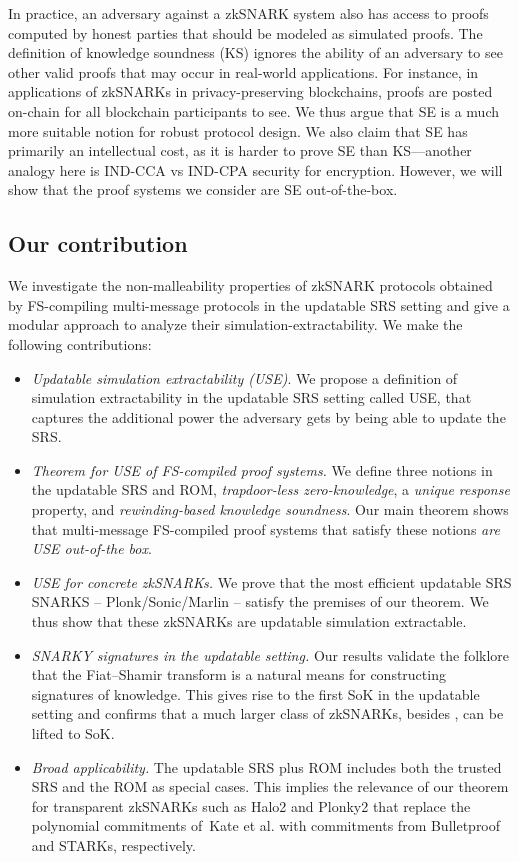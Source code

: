 \documentclass[11pt]{llncs}
\begin{document}
In practice, an adversary against a zkSNARK system also has access to proofs
computed by honest parties that should be modeled as simulated proofs. The
definition of knowledge soundness (KS) ignores the ability of an adversary to
see other valid proofs that may occur in real-world applications. For instance,
in applications of zkSNARKs in privacy-preserving blockchains, proofs are
posted on-chain for all blockchain participants to see. We thus argue that SE
is a much more suitable notion for robust protocol design. We also claim that
SE has primarily an intellectual cost, as it is harder to prove SE than
KS---another analogy here is IND-CCA vs IND-CPA security for encryption.
However, we will show that the proof systems we consider are SE out-of-the-box.

\subsection{Our contribution}
We investigate the non-malleability properties of zkSNARK protocols obtained by FS-compiling multi-message protocols in the updatable SRS setting and give a modular approach to analyze their simulation-extractability. We make the following contributions:
\begin{itemize}
\item 
\emph{Updatable simulation extractability (USE)}. 
We propose a definition of simulation extractability in the updatable SRS setting called USE, that captures the additional power the adversary gets by being able to update the SRS. 
    
\item \emph{Theorem for USE of FS-compiled proof systems.} We
         define three notions in the updatable SRS and ROM, 
        \emph{trapdoor-less zero-knowledge},
        a \emph{unique response} property, and \emph{rewinding-based
        knowledge soundness}. Our main theorem shows that multi-message FS-compiled proof systems that satisfy these notions \emph{are USE
        out-of-the box}.
    
\item
\emph{USE for concrete zkSNARKs.}
We prove that the most efficient updatable SRS SNARKS -- Plonk/Sonic/Marlin -- satisfy the premises of our theorem. We thus show that these zkSNARKs are updatable simulation extractable.

\item
  \emph{SNARKY signatures in the updatable setting.} Our results validate the folklore that the Fiat--Shamir transform is a natural means for constructing signatures of knowledge. This gives rise to the first SoK in the updatable setting and confirms that a much larger class of zkSNARKs, besides \cite{C:GroMal17}, can be lifted to SoK.

\item \emph{Broad applicability.} The updatable SRS plus ROM includes both the trusted SRS and the ROM as special cases. This implies the relevance of our theorem for transparent zkSNARKs such as Halo2 and Plonky2 that replace the polynomial commitments of~Kate et al. with commitments from Bulletproof and STARKs, respectively.
  
\end{itemize}
\end{document}
